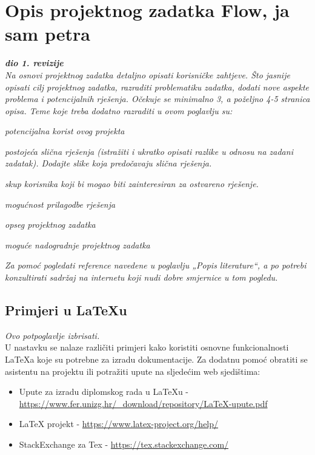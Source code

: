 \chapter{Opis projektnog zadatka Flow, ja sam petra}
		
		\textbf{\textit{dio 1. revizije}}\\
		
		\textit{Na osnovi projektnog zadatka detaljno opisati korisničke zahtjeve. Što jasnije opisati cilj projektnog zadatka, razraditi problematiku zadatka, dodati nove aspekte problema i potencijalnih rješenja. Očekuje se minimalno 3, a poželjno 4-5 stranica opisa.	Teme koje treba dodatno razraditi u ovom poglavlju su:}
		\begin{packed_item}
			\item \textit{potencijalna korist ovog projekta}
			\item \textit{postojeća slična rješenja (istražiti i ukratko opisati razlike u odnosu na zadani zadatak). Dodajte slike koja predočavaju slična rješenja.}
			\item \textit{skup korisnika koji bi mogao biti zainteresiran za ostvareno rješenje.}
			\item \textit{mogućnost prilagodbe rješenja }
			\item \textit{opseg projektnog zadatka}
			\item \textit{moguće nadogradnje projektnog zadatka}
		\end{packed_item}
		
		\textit{Za pomoć pogledati reference navedene u poglavlju „Popis literature“, a po potrebi konzultirati sadržaj na internetu koji nudi dobre smjernice u tom pogledu.}
		\eject
		
		\section{Primjeri u LaTeXu}
		
		\textit{Ovo potpoglavlje izbrisati.}\\

		U nastavku se nalaze različiti primjeri kako koristiti osnovne funkcionalnosti LaTeXa koje su potrebne za izradu dokumentacije. Za dodatnu pomoć obratiti se asistentu na projektu ili potražiti upute na sljedećim web sjedištima:
		\begin{itemize}
			\item Upute za izradu diplomskog rada u LaTeXu - \url{https://www.fer.unizg.hr/_download/repository/LaTeX-upute.pdf}
			\item LaTeX projekt - \url{https://www.latex-project.org/help/}
			\item StackExchange za Tex - \url{https://tex.stackexchange.com/}\\
		
		\end{itemize} 	


